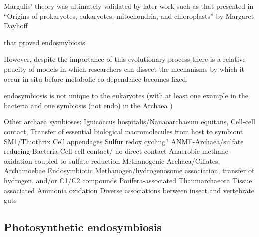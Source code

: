 Margulis' theory was ultimately validated by later work such as that presented in 
``Origins of prokaryotes, eukaryotes, mitochondria, and chloroplasts'' by Margaret Dayhoff 

that proved endosmybiosis \citep{Schwartz1976}



However, despite the importance of this evolutionary process there is a relative
paucity of models in which researchers can dissect the mechanisms by which it occur
in-situ before metabolic co-dependence becomes fixed.







endosymbiosis is not unique to the eukaryotes (with at least one example in the
bacteria \citep{vonDohlen2001} and one symbiosis (not endo) in the Archaea \citep{Huber2002})

Other archaea symbioses:
Ignicoccus hospitalis/Nanaoarchaeum equitans, Cell-cell contact, Transfer of essential biological macromolecules from host to symbiont
SM1/Thiothrix   Cell appendages Sulfur redox cycling?
ANME-Archaea/sulfate reducing Bacteria  Cell-cell contact/ no direct contact    Anaerobic methane oxidation coupled to sulfate reduction
Methanogenic Archaea/Ciliates, Archamoebae   Endosymbiotic   Methanogen/hydrogenosome association, transfer of hydrogen, and/or C1/C2 compounds
Porifera-associated Thaumarchaeota  Tissue associated   Ammonia oxidation
Diverse associations between insect and vertebrate guts
\citep{Wrede2012}







\subsection{Photosynthetic endosymbiosis}









